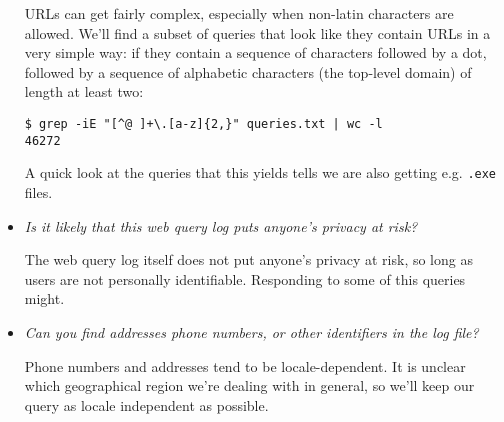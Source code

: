 \begin{itemize}
URLs can get fairly complex, especially when non-latin characters are allowed.
We'll find a subset of queries that look like they contain URLs in a very
simple way: if they contain a sequence of characters followed by a dot,
followed by a sequence of alphabetic characters (the top-level domain) of
length at least two:

\begin{verbatim}
$ grep -iE "[^@ ]+\.[a-z]{2,}" queries.txt | wc -l
46272
\end{verbatim}

A quick look at the queries that this yields tells we are also getting e.g.
\texttt{.exe} files.

\item \emph{Is it likely that this web query log puts anyone's privacy at
risk?}






The web query log itself does not put anyone's privacy at risk, so long as
users are not personally identifiable. Responding to some of this queries
might.

\item \emph{Can you find addresses phone numbers, or other identifiers in the
log file?}

Phone numbers and addresses tend to be locale-dependent. It is unclear which
geographical region we're dealing with in general, so we'll keep our query as
locale independent as possible.


\end{itemize}
